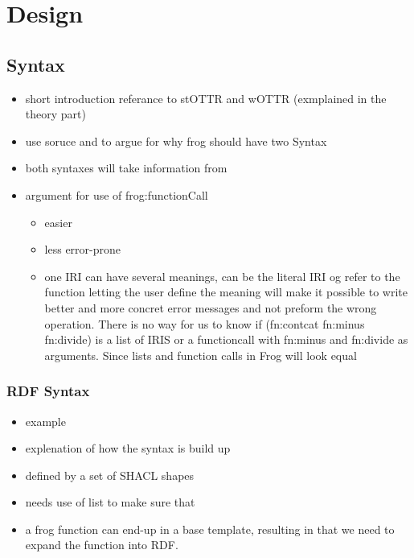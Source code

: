 
\chapter{Design} %

\section{Syntax}
\begin{itemize}
    \item short introduction referance to stOTTR and wOTTR (exmplained in the theory part)
    \item use soruce \autocite[4]{SLKK_OTTR_2021} and \autocite[481-482]{SLKF_OTTR_2018} to argue for why frog should have two Syntax
    \item both syntaxes will take information from 
    \item argument for use of frog:functionCall
    \begin{itemize}
        \item easier 
        \item less error-prone
        \item one IRI can have several meanings, can be the literal IRI og refer to the function letting the user define the meaning will make it possible to write better and more concret error messages and not preform the wrong operation. There is no way for us to know if (fn:contcat fn:minus fn:divide) is a list of IRIS or a functioncall with fn:minus and fn:divide as arguments. Since lists and function calls in Frog will look equal 
    \end{itemize}
\end{itemize}


\subsection{RDF Syntax}
\begin{itemize}
    \item example 
    \item explenation of how the syntax is build up
    \item defined by a set of SHACL shapes 
    \item needs use of list to make sure that
    \item a frog function can end-up in a base template, resulting in that we need to expand the function into RDF. 
\end{itemize}

